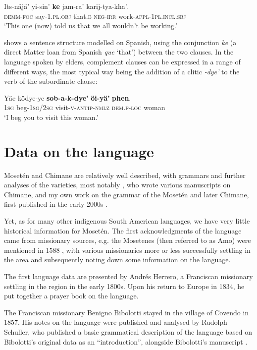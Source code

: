 \documentclass[output=paper,colorlinks,citecolor=brown
]{langscibook}
\begin{document}
\ea \label{sakel_example_4}
\gll Its-näjä’ 	yi-sin’ 		\textbf{ke} 	jam-ra’ 	karij-tya-kha’.\\
     \textsc{dem}\textsc{m}-\textsc{foc}  say-1\textsc{.pl.obj}    that.\textsc{e}  \textsc{neg}-\textsc{irr} work-\textsc{appl-1pl.incl.sbj}\\
\glt ‘This one (now) told us that we all wouldn’t be working.’
\z

 shows a sentence structure modelled on Spanish, using the conjunction \textit{ke} (a direct Matter loan from Spanish \textit{que} ‘that’) between the two clauses. In the language spoken by elders, complement clauses can be expressed in a range of different ways, the most typical way being the addition of a clitic \textit{-dye’} to the verb of the subordinate clause:

\ea \label{sakel_example_5}
\gll Yäe  	ködye-ye  	\textbf{sob-a-k-dye’}  		\textbf{öi-yä’}  		\textbf{phen}.\\
     1\textsc{sg}	beg-\textsc{1sg/2sg}	visit-\textsc{v-antip-nmlz}	\textsc{dem}.\textsc{f-loc}	woman\\
\glt ‘I beg you to visit this woman.’
\z

\section{Data on the language}
Mosetén and Chimane are relatively well described, with grammars and further analyses of the varieties, most notably \citet{gill1999pedagogical}, who wrote various manuscripts on Chimane, and my own work on the grammar of the Mosetén and later Chimane, first published in the early 2000s \citep{sakel2004grammar}.

Yet, as for many other indigenous South American languages, we have very little historical information for Mosetén. The first acknowledgments of the language came from missionary sources, e.g. the Mosetenes (then referred to as Amo) were mentioned in 1588 \citep{metraux1942native}, with various missionaries more or less successfully settling in the area and subsequently noting down some information on the language. 

The first language data are presented by Andrés Herrero, a Franciscan missionary settling in the region in the early 1800s. Upon his return to Europe in 1834, he put together a prayer book on the language.

The Franciscan missionary Benigno Bibolotti stayed in the village of Covendo in 1857. His notes on the language were published and analysed by Rudolph Schuller, who published a basic grammatical description of the language based on Bibolotti’s original data as an “introduction”, alongside Bibolotti’s manuscript \citep{bibolotti1917moseteno, schuller1917introduction}. 
\end{document}
